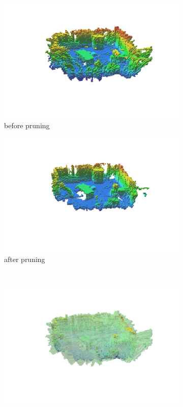 \documentclass[12pt,titlepage, a4paper]{article}
\begin{document}
\begin{figure}[h!]
	\centering
	\begin{subfigure}[h]{0.45\textwidth}
		\includegraphics[width=\textwidth]{./maps/beforePrune.png}
		\caption{before pruning}
	\end{subfigure}
	\begin{subfigure}[h]{0.45\textwidth}
		\includegraphics[width=\textwidth]{./maps/beforeMorph.png}
		\caption{after pruning}
	\end{subfigure}\\
	\begin{subfigure}[h]{0.45\textwidth}
		\includegraphics[width=\textwidth]{./maps/beforeMorph_free.png}

\end{subfigure}
\end{figure}
\end{document}
